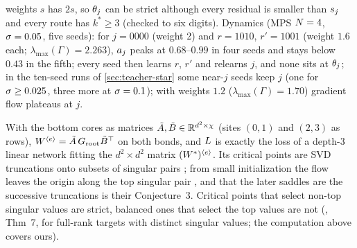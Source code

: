 weights $s$ has $2s$, so $\theta_j$ can be strict although every residual is smaller than $s_{j}$ and every route
has $k^*\ge3$ (checked to six digits). Dynamics \empirical{} (MPS $\Ns=4$, $\sigma=0.05$, five seeds): for $j=0000$
(weight 2) and $r=1010$, $r'=1001$ (weight $1.6$ each; $\lambda_{\max}(\Gamma)=2.263$), $a_{j}$ peaks at $0.68$--$0.99$ in
four seeds and stays below $0.43$ in the fifth; every seed then learns $r$, $r'$ and relearns $j$, and none sits at
$\theta_j$; in the ten-seed runs of \cref{sec:teacher-star} some near-$j$ seeds keep $j$ (one for $\sigma\ge0.025$,
three more at $\sigma=0.1$); with weights $1.2$ ($\lambda_{\max}(\Gamma)=1.70$) gradient flow plateaus at $j$.

\begin{remark}[Binary tree with $\Ns=4$]\label{rem:A-binary4-dln}
  \proven{} 
  With the bottom cores as matrices $\tilde A,\tilde B\in\mathbb{R}^{d^2\times\chi}$ (sites $(0,1)$ and $(2,3)$ as
  rows), $W^{\langle e\rangle}=\tilde A\,G_{\mathrm{root}}\tilde B^{\top}$ on both bonds, and $L$ is exactly the loss of a depth-3
  linear network fitting the $d^2\times d^2$ matrix $(W^{*})^{\langle e\rangle}$. Its critical points are SVD
  truncations onto subsets of singular pairs \citep[Prop.~1]{achour2024loss}; from small initialization the
  flow leaves the origin along the top singular pair \citep[Thm~2]{jacot2022saddletosaddle}, and that the
  later saddles are the successive truncations is their Conjecture~3. Critical points that select non-top
  singular values are strict, balanced ones that select the top values are not (\citealp{achour2024loss},
  Thm~7, for full-rank targets with distinct singular values; the computation above covers ours).
\end{remark}


